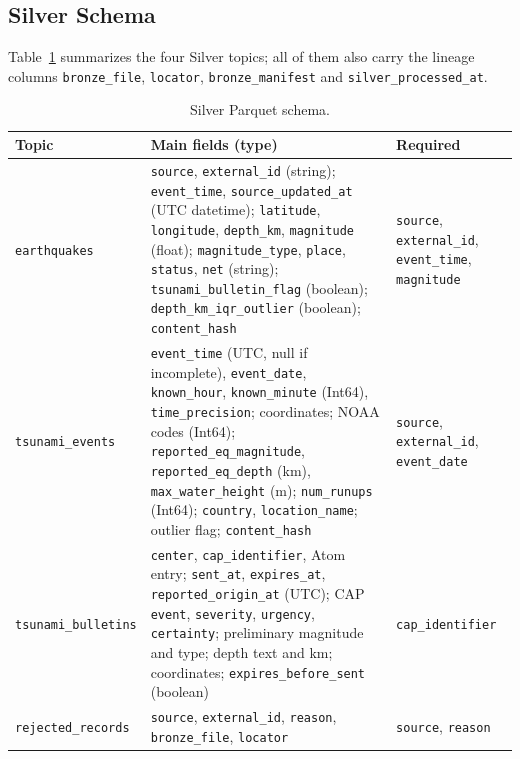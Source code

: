 \documentclass[a4paper,11pt,oneside]{book}
\begin{document}
\subsection{Silver Schema}
Table~\ref{tab:silver} summarizes the four Silver topics; all of them also carry the lineage columns \texttt{bronze\_file}, \texttt{locator}, \texttt{bronze\_manifest} and \texttt{silver\_processed\_at}.

\begin{table}[H]
\centering
\footnotesize
\begin{tabularx}{\textwidth}{@{}>{\raggedright\arraybackslash}p{3.0cm}>{\raggedright\arraybackslash}X>{\raggedright\arraybackslash}p{2.9cm}@{}}
\toprule
Topic & Main fields (type) & Required \\
\midrule
\texttt{earthquakes} & \texttt{source}, \texttt{external\_id} (string); \texttt{event\_time}, \texttt{source\_updated\_at} (UTC datetime); \texttt{latitude}, \texttt{longitude}, \texttt{depth\_km}, \texttt{magnitude} (float); \texttt{magnitude\_type}, \texttt{place}, \texttt{status}, \texttt{net} (string); \texttt{tsunami\_bulletin\_flag} (boolean); \texttt{depth\_km\_iqr\_outlier} (boolean); \texttt{content\_hash} & \texttt{source}, \texttt{external\_id}, \texttt{event\_time}, \texttt{magnitude} \\
\texttt{tsunami\_events} & \texttt{event\_time} (UTC, null if incomplete), \texttt{event\_date}, \texttt{known\_hour}, \texttt{known\_minute} (Int64), \texttt{time\_precision}; coordinates; NOAA codes (Int64); \texttt{reported\_eq\_magnitude}, \texttt{reported\_eq\_depth} (km), \texttt{max\_water\_height} (m); \texttt{num\_runups} (Int64); \texttt{country}, \texttt{location\_name}; outlier flag; \texttt{content\_hash} & \texttt{source}, \texttt{external\_id}, \texttt{event\_date} \\
\texttt{tsunami\_bulletins} & \texttt{center}, \texttt{cap\_identifier}, Atom entry; \texttt{sent\_at}, \texttt{expires\_at}, \texttt{reported\_origin\_at} (UTC); CAP \texttt{event}, \texttt{severity}, \texttt{urgency}, \texttt{certainty}; preliminary magnitude and type; depth text and km; coordinates; \texttt{expires\_before\_sent} (boolean) & \texttt{cap\_identifier} \\
\texttt{rejected\_records} & \texttt{source}, \texttt{external\_id}, \texttt{reason}, \texttt{bronze\_file}, \texttt{locator} & \texttt{source}, \texttt{reason} \\
\bottomrule
\end{tabularx}
\caption{Silver Parquet schema.}
\label{tab:silver}
\end{table}
\end{document}
